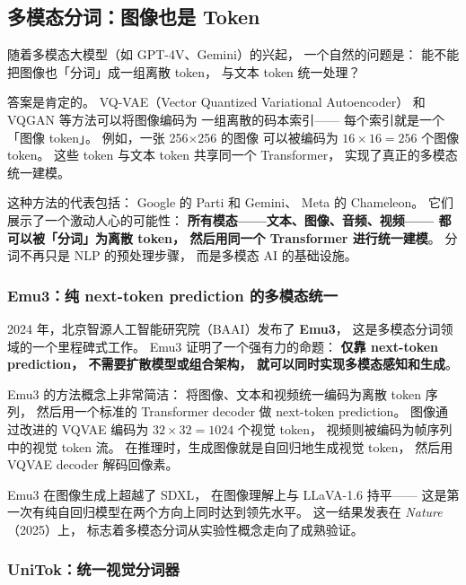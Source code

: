 \subsection{多模态分词：图像也是 Token}

随着多模态大模型（如 GPT-4V、Gemini）的兴起，
一个自然的问题是：
能不能把图像也「分词」成一组离散 token，
与文本 token 统一处理？

答案是肯定的。
VQ-VAE（Vector Quantized Variational Autoencoder）
和 VQGAN 等方法可以将图像编码为
一组离散的码本索引——
每个索引就是一个「图像 token」。
例如，一张 256$\times$256 的图像
可以被编码为 $16 \times 16 = 256$ 个图像 token。
这些 token 与文本 token 共享同一个 Transformer，
实现了真正的多模态统一建模。

这种方法的代表包括：
Google 的 Parti 和 Gemini、
Meta 的 Chameleon。
它们展示了一个激动人心的可能性：
\textbf{所有模态——文本、图像、音频、视频——
都可以被「分词」为离散 token，
然后用同一个 Transformer 进行统一建模}。
分词不再只是 NLP 的预处理步骤，
而是多模态 AI 的基础设施。

\subsubsection{Emu3：纯 next-token prediction 的多模态统一}

2024 年，北京智源人工智能研究院（BAAI）发布了 \textbf{Emu3}，
这是多模态分词领域的一个里程碑式工作。
Emu3 证明了一个强有力的命题：
\textbf{仅靠 next-token prediction，
不需要扩散模型或组合架构，
就可以同时实现多模态感知和生成}。

Emu3 的方法概念上非常简洁：
将图像、文本和视频统一编码为离散 token 序列，
然后用一个标准的 Transformer decoder 做 next-token prediction。
图像通过改进的 VQVAE 编码为 $32 \times 32 = 1024$ 个视觉 token，
视频则被编码为帧序列中的视觉 token 流。
在推理时，生成图像就是自回归地生成视觉 token，
然后用 VQVAE decoder 解码回像素。

Emu3 在图像生成上超越了 SDXL，
在图像理解上与 LLaVA-1.6 持平——
这是第一次有纯自回归模型在两个方向上同时达到领先水平。
这一结果发表在 \textit{Nature}（2025）上，
标志着多模态分词从实验性概念走向了成熟验证。

\subsubsection{UniTok：统一视觉分词器}

